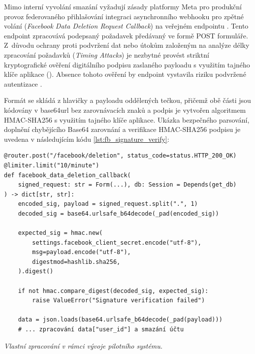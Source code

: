 \documentclass[male,czech,api_bc]{kitheses}
\newcommand{\zdroj}[1]{%
    \vspace{1ex}%
    {\footnotesize \raggedright \textit{#1}\par}%
}
\begin{document}
Mimo interní vyvolání smazání vyžadují zásady platformy Meta pro produkční provoz federovaného přihlašování integraci asynchronního webhooku pro zpětné volání (\textit{Facebook Data Deletion Request Callback}) na veřejném endpointu . Tento endpoint zpracovává podepsaný požadavek  předávaný ve formě POST formuláře. Z~důvodu ochrany proti podvržení dat nebo útokům založeným na analýze délky zpracování požadavků (\textit{Timing Attacks}) je nezbytné provést striktní kryptografické ověření digitálního podpisu zaslaného payloadu s využitím tajného klíče aplikace (). Absence tohoto ověření by endpoint vystavila riziku podvržené autentizace \cite{Yalon2023API2}.

Formát  se skládá z hlavičky a payloadu oddělených tečkou, přičemž obě části jsou kódovány v base64url bez zarovnávacích znaků a podpis je vytvořen algoritmem HMAC-SHA256 s využitím tajného klíče aplikace. Ukázka bezpečného parsování, doplnění chybějícího Base64 zarovnání a verifikace HMAC-SHA256 podpisu je uvedena v následujícím kódu \vref{lst:fb_signature_verify}:

\begin{listing}[htbp]
\begin{verbatim}
@router.post("/facebook/deletion", status_code=status.HTTP_200_OK)
@limiter.limit("10/minute")
def facebook_data_deletion_callback(
    signed_request: str = Form(...), db: Session = Depends(get_db)
) -> dict[str, str]:
    encoded_sig, payload = signed_request.split(".", 1)
    decoded_sig = base64.urlsafe_b64decode(_pad(encoded_sig))

    expected_sig = hmac.new(
        settings.facebook_client_secret.encode("utf-8"),
        msg=payload.encode("utf-8"),
        digestmod=hashlib.sha256,
    ).digest()

    if not hmac.compare_digest(decoded_sig, expected_sig):
        raise ValueError("Signature verification failed")

    data = json.loads(base64.urlsafe_b64decode(_pad(payload)))
    # ... zpracování data["user_id"] a smazání účtu
\end{verbatim}
\caption{Kryptografické ověření a dekódování callbacku signed\_request od sítě Facebook}
\label{lst:fb_signature_verify}
\zdroj{Vlastní zpracování v rámci vývoje pilotního systému.}
\end{listing}
\end{document}

